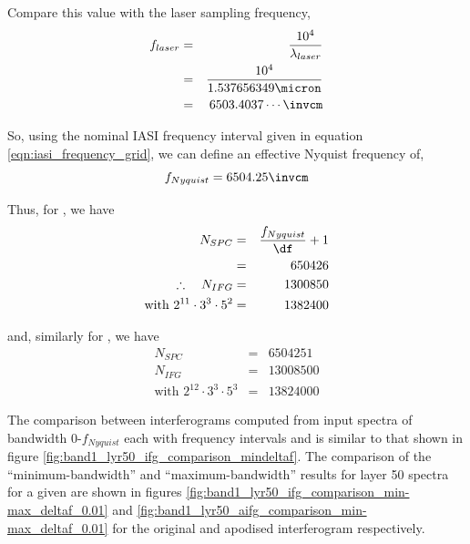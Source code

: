 Compare this value with the laser sampling frequency,
\begin{eqnarray*}
  f_{laser} & = & \frac{10^4}{\lambda_{laser}}\\
            & = & \frac{10^4}{1.537656349{\micron}}\\
            & = & 6503.4037\cdots \invcm
\end{eqnarray*}

So, using the nominal IASI frequency interval given in equation \ref{eqn:iasi_frequency_grid}, we can define an effective Nyquist frequency of,
\begin{equation*}f_{Nyquist} = 6504.25\invcm\end{equation*}

Thus, for \invcm, we have
\begin{eqnarray*}
  N_{SPC}                                  & = & \frac{f_{Nyquist}}{\df} + 1\\
                                           & = & 650426\\
  \therefore\quad N_{IFG}                  & = & 1300850\\
  \textrm{with }2^{11}\cdot3^{3}\cdot5^{2} & = & 1382400  
\end{eqnarray*}

and, similarly for \invcm, we have
\begin{eqnarray*}
  N_{SPC}                                  & = & 6504251\\
  N_{IFG}                                  & = & 13008500\\
  \textrm{with }2^{12}\cdot3^{3}\cdot5^{3} & = & 13824000
\end{eqnarray*}

The comparison between interferograms computed from input spectra of bandwidth 0-$f_{Nyquist}${\invcm} each with frequency intervals  and  is similar to that shown in figure \ref{fig:band1_lyr50_ifg_comparison_mindeltaf}. The comparison of the ``minimum-bandwidth'' and ``maximum-bandwidth'' results for layer 50 spectra for a given \df{} are shown in figures \ref{fig:band1_lyr50_ifg_comparison_min-max_deltaf_0.01} and \ref{fig:band1_lyr50_aifg_comparison_min-max_deltaf_0.01} for the original and apodised interferogram respectively.

